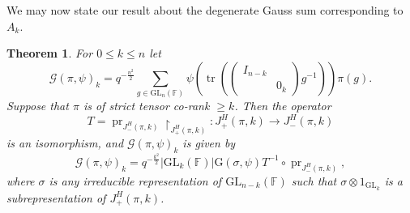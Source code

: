 \documentclass[12pt, reqno]{amsart}
\newtheorem{theorem}{Theorem}[section]
\theoremstyle{definition}
\newcommand{\sizeof}[1]{\left|#1\right|}
\newcommand{\fieldCharacter}{\psi}
\newcommand{\trace}{\operatorname{tr}}
\newcommand{\GL}{\mathrm{GL}}
\newcommand{\finiteField}{\mathbb{F}}
\newcommand{\GaussSum}[2]{\mathcal{G}\left(#1, #2\right)}
\newcommand{\GaussSumScalar}[2]{\mathrm{G}\left(#1, #2\right)}
\newcommand{\pHJacquetModule}[2]{J^H_{+}\left(#1, #2\right)}
\newcommand{\nHJacquetModule}[2]{J^H_{-}\left(#1, #2\right)}
\newcommand{\ProjectionOperator}{\operatorname{pr}}
\begin{document}
	
	We may now state our result about the degenerate Gauss sum corresponding to $A_k$.
	\begin{theorem}\label{thm:gauss-sum-in-terms-of-projection-operator}
		For $0 \le k \le n$ let \begin{displaymath}
			\GaussSum{\pi}{\fieldCharacter}_k = q^{-\frac{n^2}{2}} \sum_{g \in \GL_n\left(\finiteField\right)} \fieldCharacter\left(\trace\left(\begin{pmatrix}
				I_{n-k}\\
				& 0_k
			\end{pmatrix} g^{-1}\right)\right) \pi\left(g\right).
		\end{displaymath}
		Suppose that $\pi$ is of strict tensor co-rank $\ge k$. Then the operator
			\begin{displaymath}
				T = \ProjectionOperator_{\nHJacquetModule{\pi}{k}} \restriction_{\pHJacquetModule{\pi}{k}} \colon \pHJacquetModule{\pi}{k} \to \nHJacquetModule{\pi}{k}
			\end{displaymath}
			is an isomorphism, and $\GaussSum{\pi}{\fieldCharacter}_k$ is given by
			\begin{displaymath}
			\GaussSum{\pi}{\fieldCharacter}_k = q^{-\frac{k^2}{2}} \sizeof{\GL_{k}\left(\finiteField\right)} \GaussSumScalar{\sigma}{\fieldCharacter} T^{-1} \circ \ProjectionOperator_{\nHJacquetModule{\pi}{k}},
			\end{displaymath}
			where $\sigma$ is any irreducible representation of $\GL_{n-k}\left(\finiteField\right)$ such that $\sigma \otimes 1_{\GL_k}$ is a subrepresentation of $\pHJacquetModule{\pi}{k}$.
	\end{theorem}
\end{document}
